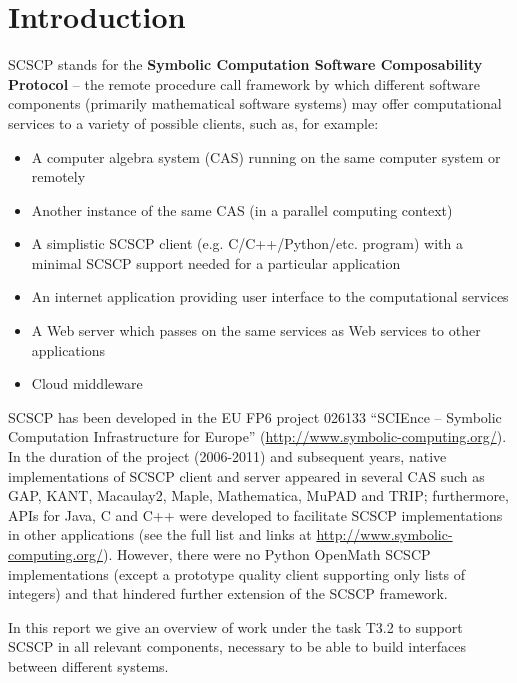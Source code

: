 \documentclass{deliverablereport}
\author{ }
\begin{document}
\maketitle
%
\strut\githubissuedescription
\newpage\tableofcontents\newpage

\section{Introduction}\label{intro}

{\sf SCSCP} stands for the 
{\bf Symbolic Computation Software Composability Protocol}
-- the remote procedure call framework by which different
software components (primarily mathematical software systems) 
may offer computational services to a variety of possible
clients, such as, for example:
\begin{itemize}
\item A computer algebra system (CAS) running on the same computer system or remotely
\item Another instance of the same CAS (in a parallel computing context)
\item A simplistic SCSCP client (e.g. C/C++/Python/etc. program) with a minimal 
SCSCP support needed for a particular application
\item An internet application providing user interface to the computational services
\item A Web server which passes on the same services as Web services to other applications
\item Cloud middleware
\end{itemize}

SCSCP has been developed in the EU FP6 project 026133 
``SCIEnce -- Symbolic Computation Infrastructure for Europe''
(\url{http://www.symbolic-computing.org/}).
In the duration of the project (2006-2011) and subsequent
years, native implementations of SCSCP client and server appeared in
several CAS such as GAP, KANT, Macaulay2, Maple, Mathematica, MuPAD
and TRIP; furthermore, APIs for Java, C and C++ were developed
to facilitate SCSCP implementations in other applications
(see the full list and links at \url{http://www.symbolic-computing.org/}).
However, there were no Python OpenMath SCSCP implementations
(except a prototype quality client supporting only lists of integers)
and that hindered further extension of the SCSCP framework.

In this report we give an overview of work under the task T3.2 
to support SCSCP in all relevant components, necessary to be able
to build interfaces between different systems. 
\end{document}
